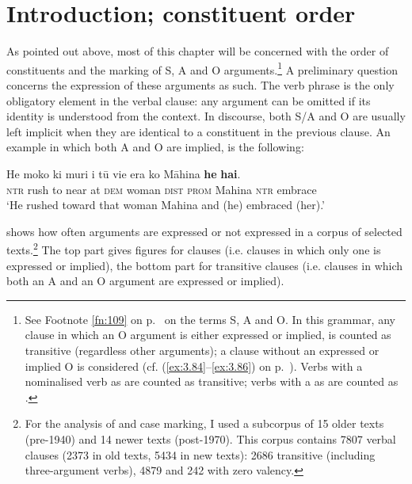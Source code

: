 \section{Introduction; constituent order}\label{sec:8.1}
As pointed out above, most of this chapter will be concerned with the order of constituents and the marking of S, A and O arguments.\footnote{\label{fn:379}See Footnote \ref{fn:109} on p.~\pageref{fn:109} on the terms S, A and O. In this grammar, any clause in which an O argument is either expressed or implied, is counted as transitive (regardless other arguments); a clause without an expressed or implied O is considered  (cf. (\ref{ex:3.84}–\ref{ex:3.86}) on p.~\pageref{ex:3.84}). Verbs with a nominalised verb as  are counted as transitive; verbs with a  as  are counted as .}  A preliminary question concerns the expression of these arguments as such. The verb phrase is the only obligatory element in the verbal clause: any argument can be omitted if its identity is understood from the context. In discourse, both S/A and O are usually left implicit when they are identical to a constituent in the previous clause. An example in which both A and O are implied, is the following:

\ea\label{ex:8.1}
\gll He moko ki muri i tū vi{\ꞌ}e era ko Māhina \textbf{he} \textbf{ha{\ꞌ}i}.\\
\textsc{ntr} rush to near at \textsc{dem} woman \textsc{dist} \textsc{prom} Mahina \textsc{ntr} embrace\\

\glt 
‘He rushed toward that woman Mahina and (he) embraced (her).’ \textstyleExampleref{[R399.191]} 
\z

 shows how often arguments are expressed or not expressed in a corpus of selected texts.\footnote{\label{fn:380}For the analysis of  and case marking, I used a subcorpus of 15 older texts (pre-1940) and 14 newer texts (post-1970). This corpus contains 7807 verbal clauses (2373 in old texts, 5434 in new texts): 2686 transitive (including three-argument verbs), 4879  and 242 with zero valency.} The top part gives figures for  clauses (i.e. clauses in which only one  is expressed or implied), the bottom part for transitive clauses (i.e. clauses in which both an A and an O argument are expressed or implied).

